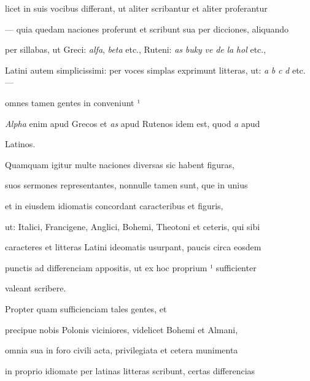 licet in suis vocibus differant, ut aliter scribantur et aliter proferantur

— quia quedam naciones proferunt et scribunt sua per dicciones, aliquando

per sillabas, ut Greci: \textit{alfa}, \textit{beta} etc., Ruteni: \textit{as} \textit{buky} \textit{ve} \textit{de} \textit{la} \textit{hol} etc.,

Latini autem simplicissimi: per voces simplas exprimunt litteras, ut: \textit{a} \textit{b} \textit{c} \textit{d} etc. —



omnes tamen gentes in  conveniunt  ¹

\textit{Alpha} enim apud Grecos et \textit{as} apud Rutenos idem est, quod \textit{a} apud

\splitlines{}

Latinos.

\indentK Quamquam igitur multe naciones diversas sic habent figuras,

\fulllines{}

suos sermones representantes, nonnulle tamen sunt, que in unius

et in eiusdem idiomatis concordant caracteribus et figuris,

ut: Italici, Francigene, Anglici, Bohemi, Theotoni et ceteris, qui sibi

caracteres et litteras Latini ideomatis usurpant, paucis circa eosdem

punctis ad differenciam appositis, ut ex hoc proprium ¹ sufficienter

\splitlines{}


valeant scribere.

\indentK Propter quam sufficienciam tales gentes, et

\fulllines{}

precipue nobis Polonis viciniores, videlicet Bohemi et Almani,

omnia sua in foro civili acta, privilegiata et cetera munimenta

in proprio idiomate per latinas litteras scribunt, certas differencias

